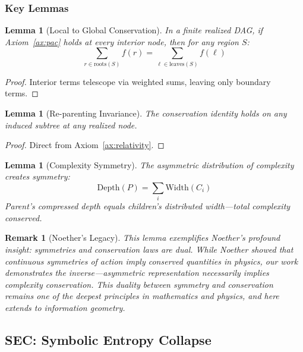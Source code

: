 \documentclass[11pt,a4paper]{article}
\newtheorem{lemma}[theorem]{Lemma}
\newtheorem{remark}{Remark}
\begin{document}
\subsubsection{Key Lemmas}

\begin{lemma}[Local to Global Conservation]
\label{lem:global}
In a finite realized DAG, if Axiom~\ref{ax:pac} holds at every interior node, then for any region $S$:
\begin{equation}
\sum_{r \in \text{roots}(S)} f(r) = \sum_{\ell \in \text{leaves}(S)} f(\ell)
\end{equation}
\end{lemma}

\begin{proof}
Interior terms telescope via weighted sums, leaving only boundary terms.
\end{proof}

\begin{lemma}[Re-parenting Invariance]
\label{lem:reparent}
The conservation identity holds on any induced subtree at any realized node.
\end{lemma}

\begin{proof}
Direct from Axiom~\ref{ax:relativity}.
\end{proof}

\begin{lemma}[Complexity Symmetry]
\label{lem:complexity}
The asymmetric distribution of complexity creates symmetry:
\begin{equation}
\text{Depth}(P) = \sum_i \text{Width}(C_i)
\end{equation}
Parent's compressed depth equals children's distributed width---total complexity conserved.
\end{lemma}

\begin{remark}[Noether's Legacy]
This lemma exemplifies Noether's profound insight: \emph{symmetries and conservation laws are dual}. While Noether showed that continuous symmetries of action imply conserved quantities in physics, our work demonstrates the inverse---asymmetric representation necessarily implies complexity conservation. This duality between symmetry and conservation remains one of the deepest principles in mathematics and physics, and here extends to information geometry.
\end{remark}

\subsection{SEC: Symbolic Entropy Collapse}
\end{document}
